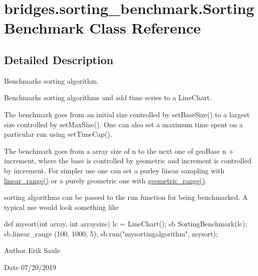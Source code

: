 \hypertarget{classbridges_1_1sorting__benchmark_1_1_sorting_benchmark}{}\section{bridges.\+sorting\+\_\+benchmark.\+Sorting\+Benchmark Class Reference}
\label{classbridges_1_1sorting__benchmark_1_1_sorting_benchmark}


\subsection{Detailed Description}
Benchmarks sorting algorithm. 

Benchmarks sorting algorithms and add time series to a Line\+Chart.

The benchmark goes from an initial size controlled by set\+Base\+Size() to a largest size controlled by set\+Max\+Size(). One can also set a maximum time spent on a particular run using set\+Time\+Cap().

The benchmark goes from a array size of n to the next one of geo\+Base n + increment, where the base is controlled by geometric and increment is controlled by increment. For simpler use one can set a purley linear sampling with \mbox{\hyperlink{classbridges_1_1sorting__benchmark_1_1_sorting_benchmark_ab5bfca8680018f4c043a78b25dbc1948}{linear\+\_\+range()}} or a purely geometric one with \mbox{\hyperlink{classbridges_1_1sorting__benchmark_1_1_sorting_benchmark_ac9bc45a12b3ebab79d05785c01e4a99e}{geometric\+\_\+range()}}.

sorting algorithms can be passed to the run function for being benchmarked. A typical use would look something like


\begin{DoxyCode}
\textcolor{keyword}{def }mysort(int array, int arraysize)
lc = LineChart();
sb SortingBenchmark(lc);
sb.linear\_range (100, 1000, 5);
sb.run(\textcolor{stringliteral}{"mysortingalgorithm"}, mysort);
\end{DoxyCode}


\begin{DoxyAuthor}{Author}
Erik Saule 
\end{DoxyAuthor}
\begin{DoxyDate}{Date}
07/20/2019 
\end{DoxyDate}
